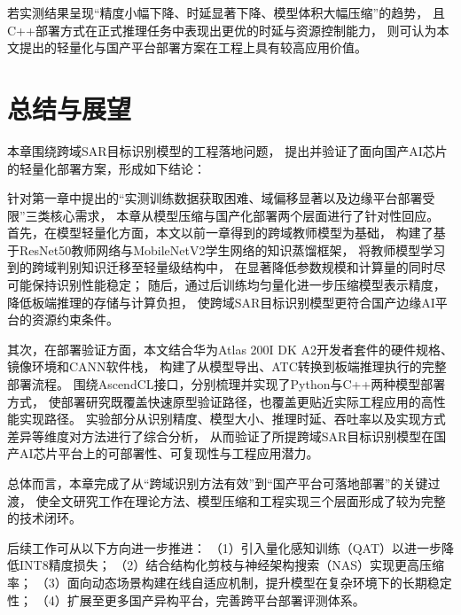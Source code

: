若实测结果呈现“精度小幅下降、时延显著下降、模型体积大幅压缩”的趋势，
且C++部署方式在正式推理任务中表现出更优的时延与资源控制能力，
则可认为本文提出的轻量化与国产平台部署方案在工程上具有较高应用价值。



\section{总结与展望}

本章围绕跨域SAR目标识别模型的工程落地问题，
提出并验证了面向国产AI芯片的轻量化部署方案，形成如下结论：

针对第一章中提出的“实测训练数据获取困难、域偏移显著以及边缘平台部署受限”三类核心需求，
本章从模型压缩与国产化部署两个层面进行了针对性回应。
首先，在模型轻量化方面，本文以前一章得到的跨域教师模型为基础，
构建了基于ResNet50教师网络与MobileNetV2学生网络的知识蒸馏框架，
将教师模型学习到的跨域判别知识迁移至轻量级结构中，
在显著降低参数规模和计算量的同时尽可能保持识别性能稳定；
随后，通过后训练均匀量化进一步压缩模型表示精度，降低板端推理的存储与计算负担，
使跨域SAR目标识别模型更符合国产边缘AI平台的资源约束条件。

其次，在部署验证方面，本文结合华为Atlas 200I DK A2开发者套件的硬件规格、镜像环境和CANN软件栈，
构建了从模型导出、ATC转换到板端推理执行的完整部署流程。
围绕AscendCL接口，分别梳理并实现了Python与C++两种模型部署方式，
使部署研究既覆盖快速原型验证路径，也覆盖更贴近实际工程应用的高性能实现路径。
实验部分从识别精度、模型大小、推理时延、吞吐率以及实现方式差异等维度对方法进行了综合分析，
从而验证了所提跨域SAR目标识别模型在国产AI芯片平台上的可部署性、可复现性与工程应用潜力。

总体而言，本章完成了从“跨域识别方法有效”到“国产平台可落地部署”的关键过渡，
使全文研究工作在理论方法、模型压缩和工程实现三个层面形成了较为完整的技术闭环。

后续工作可从以下方向进一步推进：
（1）引入量化感知训练（QAT）以进一步降低INT8精度损失；
（2）结合结构化剪枝与神经架构搜索（NAS）实现更高压缩率；
（3）面向动态场景构建在线自适应机制，提升模型在复杂环境下的长期稳定性；
（4）扩展至更多国产异构平台，完善跨平台部署评测体系。